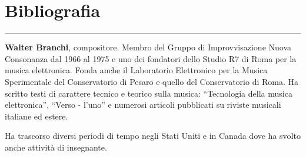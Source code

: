 \documentclass[11pt,twoside,openany]{book}
\begin{document}


\backmatter
\chapter*{Bibliografia}
\nocite{*}                       %
\printbibliography[heading=none]

\cleardoublepage
\thispagestyle{empty}
\vspace*{2cm}
\begin{center}
  \rule{0.4\textwidth}{0.4pt}
\end{center}
\vspace{1cm}
\noindent\textbf{Walter Branchi}, compositore. Membro del Gruppo di
Improvvisazione Nuova Consonanza dal 1966 al 1975 e uno dei fondatori dello
Studio R7 di Roma per la musica elettronica. Fonda anche il Laboratorio
Elettronico per la Musica Sperimentale del Conservatorio di Pesaro e quello del
Conservatorio di Roma. Ha scritto testi di carattere tecnico e teorico sulla
musica: \enquote{Tecnologia della musica elettronica}, \enquote{Verso - l'uno}
e numerosi articoli pubblicati su riviste musicali italiane ed estere.

\smallskip
\noindent Ha trascorso diversi periodi di tempo negli Stati Uniti e in Canada
dove ha svolto anche attività di insegnante.
\end{document}
